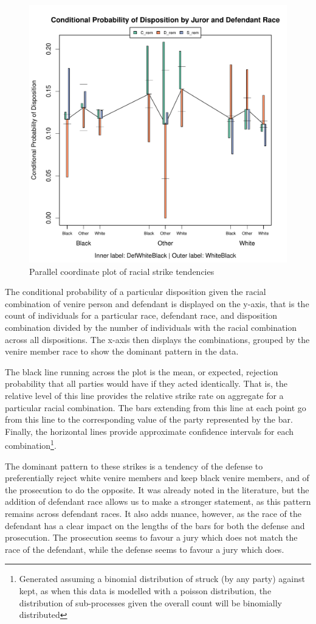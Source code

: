 \documentclass{article}
\begin{document}
\begin{figure}[!h]
  \centering
  \includegraphics[width=0.7\linewidth]{Plots/CondDistRaces}
  \caption{Parallel coordinate plot of racial strike tendencies}
  \label{fig:raceraceparcoord}
\end{figure}

The conditional probability of a particular disposition given the racial combination of venire person and defendant is displayed
on the y-axis, that is the count of individuals for a particular race, defendant race, and disposition combination divided by the
number of individuals with the racial combination across all dispositions. The x-axis then displays the combinations, grouped by
the venire member race to show the dominant pattern in the data.

The black line running across the plot is the mean, or expected, rejection probability that all parties would have if they acted
identically. That is, the relative level of this line provides the relative strike rate on aggregate for a particular racial
combination. The bars extending from this line at each point go from this line to the corresponding value of the party represented
by the bar. Finally, the horizontal lines provide approximate confidence intervals for each combination\footnote{Generated
  assuming a binomial distribution of struck (by any party) against kept, as when this data is modelled with a poisson
  distribution, the distribution of sub-processes given the overall count will be binomially distributed}.

The dominant pattern to these strikes is a tendency of the defense to preferentially reject white venire members and keep black
venire members, and of the prosecution to do the opposite. It was already noted in the literature\cite{JurySunshineProj}, but the
addition of defendant race allows us to make a stronger statement, as this pattern remains across defendant races. It also adds
nuance, however, as the race of the defendant has a clear impact on the lengths of the bars for both the defense and
prosecution. The prosecution seems to favour a jury which does not match the race of the defendant, while the defense seems to
favour a jury which does.
\end{document}
